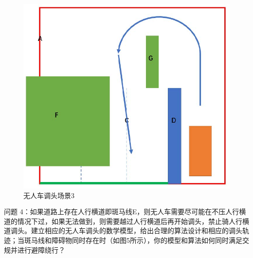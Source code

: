 \documentclass{article}
\begin{document}
\begin{figure}[H]%
    \centering
    \includegraphics[scale=0.8]{3.jpg}
    \caption{无人车调头场景3}
\end{figure}

问题 4：如果道路上存在人行横道即斑马线E，则无人车需要尽可能在不压人行横道的情况下过，如果无法做到，则需要越过人行横道后再开始调头，禁止骑人行横道调头。建立相应的无人车调头的数学模型，给出合理的算法设计和相应的调头轨迹；当斑马线和障碍物同时存在时（如图5所示），你的模型和算法如何同时满足交规并进行避障绕行？
\end{document}
